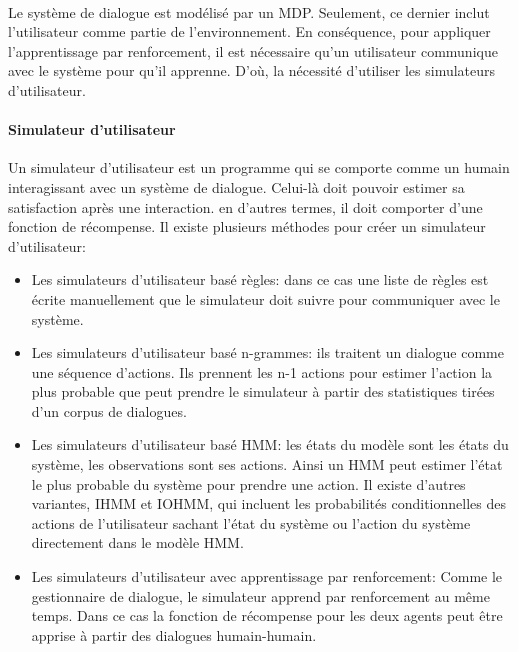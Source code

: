 \paragraph{}
Le système de dialogue est modélisé par un MDP. Seulement, ce dernier inclut l’utilisateur comme partie de l’environnement. En conséquence, pour appliquer l’apprentissage par renforcement, il est nécessaire qu’un utilisateur communique avec le système pour qu’il apprenne. D’où, la nécessité d’utiliser les simulateurs d’utilisateur.

\paragraph{Simulateur d'utilisateur}
Un simulateur d’utilisateur est un programme qui se comporte comme un humain interagissant avec un système de dialogue. Celui-là doit pouvoir estimer sa satisfaction après une interaction. en d’autres termes, il doit comporter d'une fonction de récompense. Il existe plusieurs méthodes pour créer un simulateur d’utilisateur:
\begin{itemize}
	\item Les simulateurs d’utilisateur basé règles: dans ce cas une liste de règles est écrite manuellement que le simulateur doit suivre pour communiquer avec le système\cite{Schatzmann2007}.
	\item Les simulateurs d’utilisateur basé n-grammes: ils traitent un dialogue comme une séquence d’actions. Ils prennent les n-1 actions pour estimer l’action la plus probable que peut prendre le simulateur à partir des statistiques tirées d'un	 corpus de dialogues\cite{Georgila2005}.
	\item Les simulateurs d’utilisateur basé HMM: les états du modèle sont les états du système, les observations sont ses actions. Ainsi un HMM peut estimer l’état le plus probable du système pour prendre une action. Il existe d’autres variantes, IHMM et IOHMM, qui incluent les probabilités conditionnelles des actions de l'utilisateur sachant l’état du système ou l’action du système directement dans le modèle HMM\cite{Cuayhuitl2005}.
	\item Les simulateurs d’utilisateur avec apprentissage par renforcement: Comme le gestionnaire de dialogue, le simulateur apprend par renforcement au même temps. Dans ce cas la fonction de récompense pour les deux agents peut être apprise à partir des dialogues humain-humain\cite{Chandramohan2011}.
\end{itemize}







